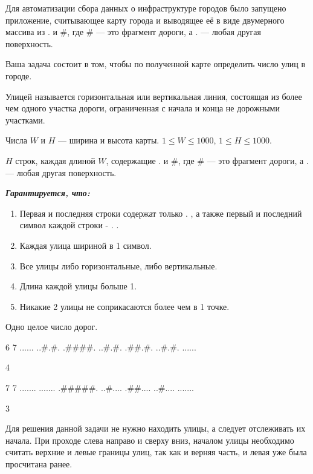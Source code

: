 
Для автоматизации сбора данных о инфраструктуре городов было запущено приложение, считывающее карту города и выводящее её в виде двумерного массива из . и \#, где \# — это фрагмент дороги, а . — любая другая поверхность.

Ваша задача состоит в том, чтобы по полученной карте определить число улиц в городе.

Улицей называется горизонтальная или вертикальная линия, состоящая из более чем одного участка дороги, ограниченная с начала и конца не дорожными участками.


Числа $W$ и $H$ — ширина и высота карты. $1\leq W\leq 1000$, $1\leq H\leq 1000$.

$H$ строк, каждая длиной $W$, содержащие . и \#, где \# — это фрагмент дороги, а . — любая другая поверхность.

\textbf{\textit{Гарантируется, что:}}

\begin{enumerate}
    \item Первая и последняя строки содержат только . , а также первый и последний символ каждой строки - . .
    \item Каждая улица шириной в 1 символ.
    \item Все улицы либо горизонтальные, либо вертикальные.
    \item Длина каждой улицы больше 1.
    \item Никакие 2 улицы не соприкасаются более чем в 1 точке.
\end{enumerate}

\outputfmtSection

Одно целое число дорог.


\begin{myverbbox}[\small]{\vinput}
    6 7
    ......
    ..#.#.
    .####.
    ..#.#.
    .##.#.
    ..#.#.
    ......
\end{myverbbox}
\begin{myverbbox}[\small]{\voutput}
    4
\end{myverbbox}


\begin{myverbbox}[\small]{\vinput}
    7 7
    .......
    .......
    .#####.
    ..#....
    .##....
    ..#....
    .......
\end{myverbbox}
\begin{myverbbox}[\small]{\voutput}
    3
\end{myverbbox}

\solutionSection

Для решения данной задачи не нужно находить улицы, а следует отслеживать их начала. При проходе слева направо и сверху вниз, началом улицы необходимо считать верхние и левые границы улиц, так как и верняя часть, и левая уже была просчитана ранее.

